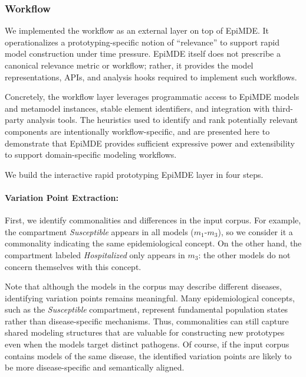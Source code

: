 \subsubsection{Workflow}
\label{sec:prototyping_workflow}

We implemented the workflow as an external layer on top of EpiMDE. It operationalizes a prototyping-specific notion of ``relevance'' to support rapid model construction under time pressure. EpiMDE itself does not prescribe a canonical relevance metric or workflow; rather, it provides the model representations, APIs, and analysis hooks required to implement such workflows.

Concretely, the workflow layer leverages programmatic access to EpiMDE models and metamodel instances, stable element identifiers, and integration with third-party analysis tools. The heuristics used to identify and rank potentially relevant components are intentionally workflow-specific, and are presented here to demonstrate that EpiMDE provides sufficient expressive power and extensibility to support domain-specific modeling workflows.

We build the interactive rapid prototyping EpiMDE layer in four steps.

\paragraph{Variation Point Extraction:} 
First, we identify commonalities and differences in the input corpus.
For example, the compartment \textit{Susceptible} appears in all models ($m_1$-$m_3$), so we consider it a commonality indicating the same epidemiological concept. 
On the other hand, the compartment labeled \textit{Hospitalized} only appears in $m_3$: the other models do not concern themselves with this concept.

Note that although the models in the corpus may describe different diseases, identifying variation points remains meaningful. Many epidemiological concepts, such as the \textit{Susceptible} compartment, represent fundamental population states rather than disease-specific mechanisms. Thus, commonalities can still capture shared modeling structures that are valuable for constructing new prototypes even when the models target distinct pathogens. Of course, if the input corpus contains models of the same disease, the identified variation points are likely to be more disease-specific and semantically aligned.

